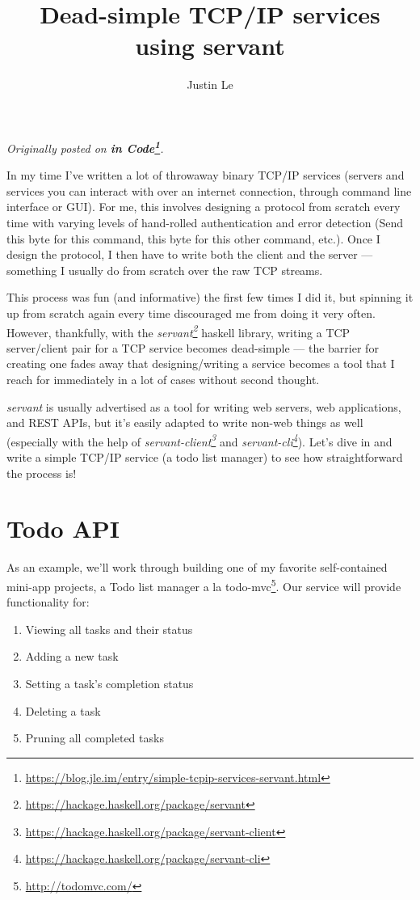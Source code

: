 \documentclass[]{article}
\title{Dead-simple TCP/IP services using servant}
\author{Justin Le}
\renewcommand{\href}[2]{#2\footnote{\url{#1}}}
\begin{document}
\maketitle

\emph{Originally posted on
\textbf{\href{https://blog.jle.im/entry/simple-tcpip-services-servant.html}{in
Code}}.}

In my time I've written a lot of throwaway binary TCP/IP services (servers and
services you can interact with over an internet connection, through command line
interface or GUI). For me, this involves designing a protocol from scratch every
time with varying levels of hand-rolled authentication and error detection (Send
this byte for this command, this byte for this other command, etc.). Once I
design the protocol, I then have to write both the client and the server ---
something I usually do from scratch over the raw TCP streams.

This process was fun (and informative) the first few times I did it, but
spinning it up from scratch again every time discouraged me from doing it very
often. However, thankfully, with the
\emph{\href{https://hackage.haskell.org/package/servant}{servant}} haskell
library, writing a TCP server/client pair for a TCP service becomes dead-simple
--- the barrier for creating one fades away that designing/writing a service
becomes a tool that I reach for immediately in a lot of cases without second
thought.

\emph{servant} is usually advertised as a tool for writing web servers, web
applications, and REST APIs, but it's easily adapted to write non-web things as
well (especially with the help of
\emph{\href{https://hackage.haskell.org/package/servant-client}{servant-client}}
and \emph{\href{https://hackage.haskell.org/package/servant-cli}{servant-cli}}).
Let's dive in and write a simple TCP/IP service (a todo list manager) to see how
straightforward the process is!

\hypertarget{todo-api}{%
\section{Todo API}\label{todo-api}}

As an example, we'll work through building one of my favorite self-contained
mini-app projects, a \href{http://todomvc.com/}{Todo list manager a la
todo-mvc}. Our service will provide functionality for:

\begin{enumerate}
\def\labelenumi{\arabic{enumi}.}
\tightlist
\item
  Viewing all tasks and their status
\item
  Adding a new task
\item
  Setting a task's completion status
\item
  Deleting a task
\item
  Pruning all completed tasks
\end{enumerate}
\end{document}
